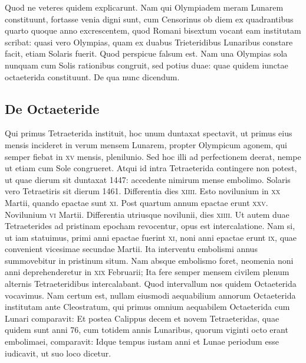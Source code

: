 Quod ne veteres quidem explicarunt.
Nam qui Olympiadem meram
Lunarem constituunt, fortasse venia digni sunt, cum Censorinus ob
diem ex quadrantibus quarto quoque anno excrescentem, quod Romani
bisextum vocant eam institutam scribat:
quasi vero Olympias,
quam ex duabus Trieteridibus Lunaribus constare facit, etiam Solaris
fuerit.
Quod perspicue falsum est.
Nam una Olympias sola nunquam
cum Solis rationibus congruit, sed potius duae: quae quidem iunctae
octaeterida constituunt.
De qua nunc dicendum.

\subsection{De Octaeteride}
Qui primus Tetraeterida instituit, hoc unum duntaxat spectavit,
ut primus eius mensis incideret in verum mensem Lunarem,
propter Olympicum agonem, qui semper fiebat in \textsc{xv}
mensis, plenilunio.
Sed hoc illi ad perfectionem deerat, nempe ut etiam
cum Sole congrueret.
Atqui id intra Tetraeterida contingere non potest,
ut quae dierum sit duntaxat 1447: accedente nimirum mense embolimo.
Solaris vero Tetraetiris sit dierum 1461.
Differentia dies \textsc{xiiii}.
Esto novilunium in \textsc{xx} Martii, quando epactae sunt \textsc{xi}.
Post quartum
annum epactae erunt \textsc{xxv}.
Novilunium \textsc{vi} Martii.
Differentia
utriusque novilunii, dies \textsc{xiiii}.
Ut autem duae Tetraeterides ad pristinam
epocham revocentur, opus est intercalatione.
Nam si, ut iam
statuimus, primi anni epactae fuerint \textsc{xi},
 noni anni epactae erunt \textsc{ix},
quae convenient vicesimae secundae Martii.
Ita interventu embolismi
annus summovebitur in pristinum situm.
Nam absque embolismo
foret, neomenia noni anni deprehenderetur in \textsc{xix} Februarii;
Ita fere
semper mensem civilem plenum alternis Tetraeteridibus intercalabant.
Quod intervallum nos quidem Octaeterida vocavimus.
Nam
certum est, nullam eiusmodi aequabilium annorum Octaeterida institutam
ante Cleostratum, qui primus omnium aequabilem Octaeterida
cum Lunari comparavit:
Et postea Calippus decem et novem
Tetraeteridas, quae quidem sunt anni 76, cum totidem annis Lunaribus,
quorum viginti octo erant embolimaei, comparavit:
Idque
tempus iustam anni et Lunae periodum esse iudicavit, ut suo loco dicetur.

